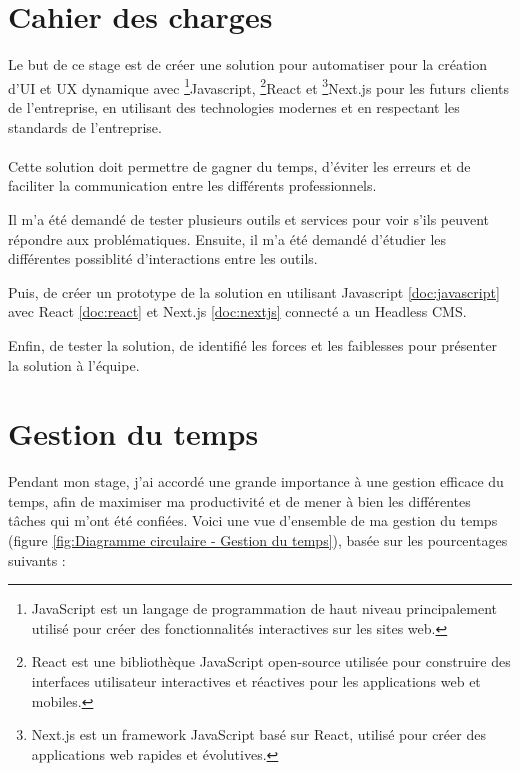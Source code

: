 \section{Cahier des charges}
Le but de ce stage est de créer une solution pour automatiser pour la création d'UI et UX dynamique avec \footnote{JavaScript est un langage de programmation de haut niveau principalement utilisé pour créer des fonctionnalités interactives sur les sites web.}Javascript, \footnote{React est une bibliothèque JavaScript open-source utilisée pour construire des interfaces utilisateur interactives et réactives pour les applications web et mobiles.}React et \footnote{Next.js est un framework JavaScript basé sur React, utilisé pour créer des applications web rapides et évolutives.}Next.js pour les futurs clients de l'entreprise, en utilisant des technologies modernes et en respectant les standards de l'entreprise. 
\\ \\
Cette solution doit permettre de gagner du temps, d'éviter les erreurs et de faciliter la communication entre les différents professionnels.

Il m'a été demandé de tester plusieurs outils et services pour voir s'ils peuvent répondre aux problématiques.
Ensuite, il m'a été demandé d'étudier les différentes possiblité d'interactions entre les outils. 

Puis, de créer un prototype de la solution en utilisant Javascript \ref{doc:javascript} avec React \ref{doc:react} et Next.js \ref{doc:nextjs} connecté a un Headless CMS.

Enfin, de tester la solution, de identifié les forces et les faiblesses pour présenter la solution à l'équipe.

\section{Gestion du temps}

Pendant mon stage, j'ai accordé une grande importance à une gestion efficace du temps, afin de maximiser ma productivité et de mener à bien les différentes tâches qui m'ont été confiées. Voici une vue d'ensemble de ma gestion du temps (figure \ref{fig:Diagramme circulaire - Gestion du temps}), basée sur les pourcentages suivants :

